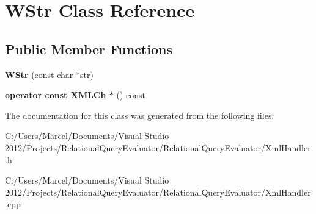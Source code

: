 \hypertarget{class_w_str}{\section{W\+Str Class Reference}
\label{class_w_str}
}
\subsection*{Public Member Functions}
\begin{DoxyCompactItemize}
\item 
\hypertarget{class_w_str_a0f1f21c92549b4a1b421d956f22c9325}{{\bfseries W\+Str} (const char $\ast$str)}\label{class_w_str_a0f1f21c92549b4a1b421d956f22c9325}

\item 
\hypertarget{class_w_str_a15ed335f1d00ecb39034db4d9d53acad}{{\bfseries operator const X\+M\+L\+Ch $\ast$} () const }\label{class_w_str_a15ed335f1d00ecb39034db4d9d53acad}

\end{DoxyCompactItemize}


The documentation for this class was generated from the following files\+:\begin{DoxyCompactItemize}
\item 
C\+:/\+Users/\+Marcel/\+Documents/\+Visual Studio 2012/\+Projects/\+Relational\+Query\+Evaluator/\+Relational\+Query\+Evaluator/Xml\+Handler.\+h\item 
C\+:/\+Users/\+Marcel/\+Documents/\+Visual Studio 2012/\+Projects/\+Relational\+Query\+Evaluator/\+Relational\+Query\+Evaluator/Xml\+Handler.\+cpp\end{DoxyCompactItemize}
